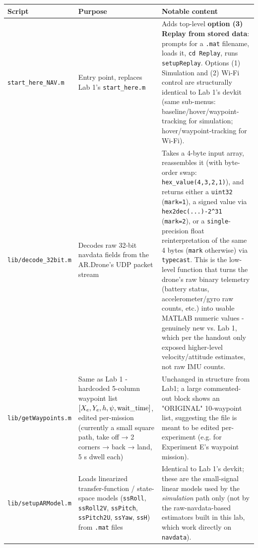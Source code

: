 \documentclass[11pt]{article}
\begin{document}
\begin{center}
\small
\setlength{\tabcolsep}{3pt}
\begin{longtable}{|p{3.0cm}|p{4.2cm}|p{7.0cm}|}
\hline
Script & Purpose & Notable content \\
\hline
\endhead
\texttt{start\_\allowbreak{}here\_\allowbreak{}NAV.m} & Entry point, replaces Lab 1's \texttt{start\_\allowbreak{}here.m} & Adds top-level \textbf{option (3) Replay from stored data}: prompts for a \texttt{.mat} filename, loads it, \texttt{cd Replay}, runs \texttt{setupReplay}. Options (1) Simulation and (2) Wi-Fi control are structurally identical to Lab 1's devkit (same sub-menus: baseline/hover/waypoint-tracking for simulation; hover/waypoint-tracking for Wi-Fi). \\
\hline
\texttt{lib/\allowbreak{}decode\_\allowbreak{}32bit.m} & Decodes raw 32-bit navdata fields from the AR.Drone's UDP packet stream & Takes a 4-byte input array, reassembles it (with byte-order swap: \texttt{hex\_\allowbreak{}value(4,3,2,1)}), and returns either a \texttt{uint32} (\texttt{mark=1}), a signed value via \texttt{hex2dec(...)-2\textasciicircum31} (\texttt{mark=2}), or a \texttt{single}-precision float reinterpretation of the same 4 bytes (\texttt{mark} otherwise) via \texttt{typecast}. This is the low-level function that turns the drone's raw binary telemetry (battery status, accelerometer/gyro raw counts, etc.) into usable MATLAB numeric values - genuinely new vs. Lab 1, which per the handout only exposed higher-level velocity/attitude estimates, not raw IMU counts. \\
\hline
\texttt{lib/\allowbreak{}getWaypoints.m} & Same as Lab 1 - hardcoded 5-column waypoint list $[X_e, Y_e, h, \psi, \text{wait\_\allowbreak{}time}]$, edited per-mission (currently a small square path, take off → 2 corners → back → land, 5 s dwell each) & Unchanged in structure from Lab1; a large commented-out block shows an "ORIGINAL" 10-waypoint list, suggesting the file is meant to be edited per-experiment (e.g. for Experiment E's waypoint mission). \\
\hline
\texttt{lib/\allowbreak{}setupARModel.m} & Loads linearized transfer-function / state-space models (\texttt{ssRoll}, \texttt{ssRoll2V}, \texttt{ssPitch}, \texttt{ssPitch2U}, \texttt{ssYaw}, \texttt{ssH}) from \texttt{.mat} files & Identical to Lab 1's devkit; these are the small-signal linear models used by the \textit{simulation} path only (not by the raw-navdata-based estimators built in this lab, which work directly on \texttt{navdata}). \\

\end{longtable}
\end{center}
\end{document}
